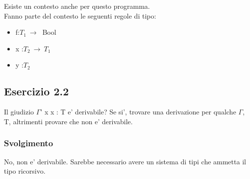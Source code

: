 	Esiste un contesto anche per questo programma. \\
	Fanno parte del contesto le seguenti regole di tipo:
\begin{itemize}
	\item f:$T_1\:\rightarrow\:$ Bool
	\item x :$T_2\:\rightarrow\:T_1$
	\item y :$T_2$
\end{itemize}


\subsection*{Esercizio 2.2}
Il giudizio $\Gamma$' x x : T e' derivabile? Se si', trovare una derivazione per qualche $\Gamma$, T, altrimenti provare che non e' derivabile.

\subsubsection*{Svolgimento}
 	\begin{prooftree} 
	\end{prooftree} 

No, non e' derivabile. Sarebbe necessario avere un sistema di tipi che ammetta il tipo ricorsivo. \\


